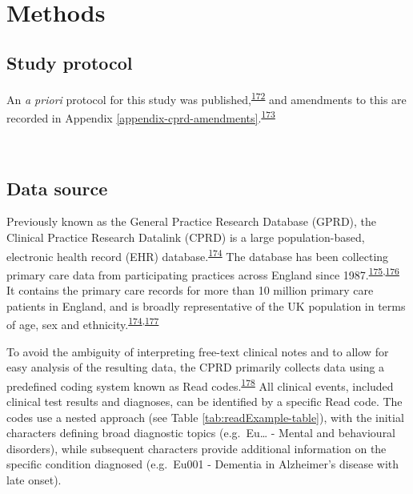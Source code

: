 \documentclass[a4paper, twoside]{templates/ociamthesis}
\begin{document}
~

\hypertarget{methods-1}{%
\section{Methods}\label{methods-1}}

\hypertarget{study-protocol}{%
\subsection{Study protocol}\label{study-protocol}}

An \emph{a priori} protocol for this study was published,\textsuperscript{\protect\hyperlink{ref-walker2016}{172}} and amendments to this are recorded in Appendix \ref{appendix-cprd-amendments}.\textsuperscript{\protect\hyperlink{ref-vonelm2008}{173}}

~

\hypertarget{cprd-data-source}{%
\subsection{Data source}\label{cprd-data-source}}

Previously known as the General Practice Research Database (GPRD), the Clinical Practice Research Datalink (CPRD) is a large population-based, electronic health record (EHR) database.\textsuperscript{\protect\hyperlink{ref-herrett2015}{174}} The database has been collecting primary care data from participating practices across England since 1987.\textsuperscript{\protect\hyperlink{ref-williams2012}{175},\protect\hyperlink{ref-wood2001revitalizing}{176}} It contains the primary care records for more than 10 million primary care patients in England, and is broadly representative of the UK population in terms of age, sex and ethnicity.\textsuperscript{\protect\hyperlink{ref-herrett2015}{174},\protect\hyperlink{ref-mathur2014}{177}}

To avoid the ambiguity of interpreting free-text clinical notes and to allow for easy analysis of the resulting data, the CPRD primarily collects data using a predefined coding system known as Read codes.\textsuperscript{\protect\hyperlink{ref-booth1994}{178}} All clinical events, included clinical test results and diagnoses, can be identified by a specific Read code. The codes use a nested approach (see Table \ref{tab:readExample-table}), with the initial characters defining broad diagnostic topics (e.g.~Eu\ldots{} - Mental and behavioural disorders), while subsequent characters provide additional information on the specific condition diagnosed (e.g.~Eu001 - Dementia in Alzheimer's disease with late onset).
\end{document}
